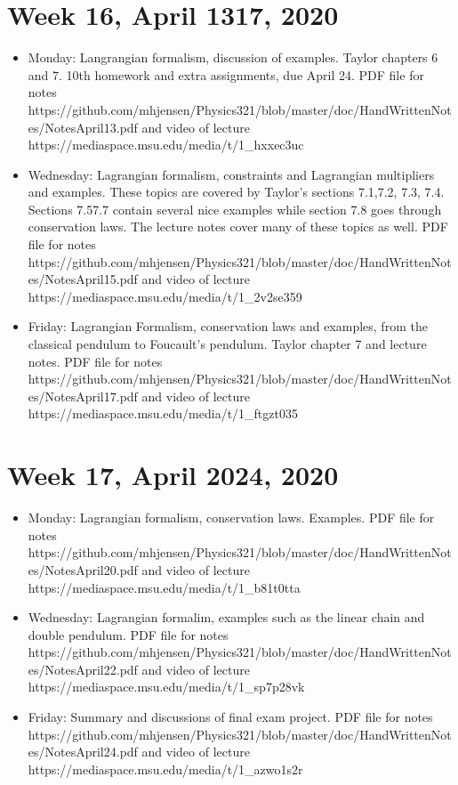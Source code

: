 \documentclass[letterpaper,10pt,english]{sphinxmanual}
\begin{document}
\section{Week 16, April 13\sphinxhyphen{}17, 2020}
\label{\detokenize{intro:week-16-april-13-17-2020}}\begin{itemize}
\item {} 
Monday:  Langrangian formalism, discussion of examples. Taylor chapters 6 and 7. 10th homework and extra assignments, due April 24. PDF file for notes https://github.com/mhjensen/Physics321/blob/master/doc/HandWrittenNotes/NotesApril13.pdf and video of lecture https://mediaspace.msu.edu/media/t/1\_hxxec3uc

\item {} 
Wednesday: Lagrangian formalism, constraints and Lagrangian multipliers and examples. These topics are covered by Taylor’s sections 7.1,7.2, 7.3, 7.4. Sections 7.5\sphinxhyphen{}7.7 contain several nice examples while section 7.8 goes through conservation laws. The lecture notes cover many of these topics as well.  PDF file for notes https://github.com/mhjensen/Physics321/blob/master/doc/HandWrittenNotes/NotesApril15.pdf and video of lecture https://mediaspace.msu.edu/media/t/1\_2v2se359

\item {} 
Friday:  Lagrangian Formalism, conservation laws and examples, from the classical pendulum to Foucault’s pendulum. Taylor chapter 7 and lecture notes. PDF file for notes https://github.com/mhjensen/Physics321/blob/master/doc/HandWrittenNotes/NotesApril17.pdf and video of lecture https://mediaspace.msu.edu/media/t/1\_ftgzt035

\end{itemize}


\section{Week 17, April 20\sphinxhyphen{}24, 2020}
\label{\detokenize{intro:week-17-april-20-24-2020}}\begin{itemize}
\item {} 
Monday:  Lagrangian formalism, conservation laws. Examples. PDF file for notes https://github.com/mhjensen/Physics321/blob/master/doc/HandWrittenNotes/NotesApril20.pdf and video of lecture https://mediaspace.msu.edu/media/t/1\_b81t0tta

\item {} 
Wednesday: Lagrangian formalim, examples such as the linear chain and double pendulum. PDF file for notes https://github.com/mhjensen/Physics321/blob/master/doc/HandWrittenNotes/NotesApril22.pdf and video of lecture https://mediaspace.msu.edu/media/t/1\_sp7p28vk

\item {} 
Friday:  Summary and discussions of final exam project.    PDF file for notes https://github.com/mhjensen/Physics321/blob/master/doc/HandWrittenNotes/NotesApril24.pdf and video of lecture https://mediaspace.msu.edu/media/t/1\_azwo1s2r

\end{itemize}
\end{document}

